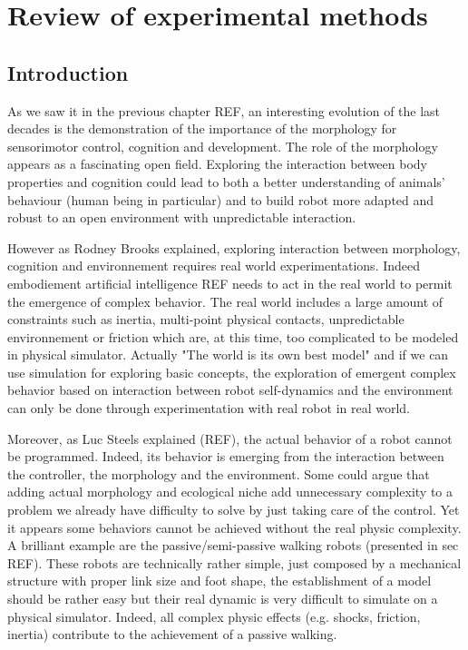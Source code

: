 
% 
\chapter{Review of experimental methods} %
\label{cha:experimental-methods}


\section{Introduction} %

As we saw it in the previous chapter REF, an interesting evolution of the last decades is the demonstration of the importance of the morphology for sensorimotor control, cognition and development. The role of the morphology appears as a fascinating open field. Exploring the interaction between body properties and cognition could lead to both a better understanding of animals’ behaviour (human being in particular) and to build robot more adapted and robust to an open environment with unpredictable interaction.


However as Rodney Brooks explained, exploring interaction between morphology, cognition and environnement requires real world experimentations. Indeed embodiement artificial intelligence REF needs to act in the real world to permit the emergence of complex behavior. The real world includes a large amount of constraints such as inertia, multi-point physical contacts, unpredictable environnement or friction which are, at this time, too complicated to be modeled in physical simulator. Actually "The world is its own best model" and if we can use simulation for exploring basic concepts, the exploration of emergent complex behavior based on interaction between robot self-dynamics and the environment can only be done through experimentation with real robot in real world.

Moreover, as Luc Steels explained (REF), the actual behavior of a robot cannot be programmed. Indeed, its behavior is emerging from the interaction between the controller, the morphology and the environment. Some could argue that adding actual morphology and ecological niche add unnecessary complexity to a problem we already have difficulty to solve by just taking care of the control. Yet it appears some behaviors cannot be achieved without the real physic complexity. A brilliant example are the passive/semi-passive walking robots (presented in sec REF). These robots are technically rather simple, just composed by a mechanical structure with proper link size and foot shape, the establishment of a model should be rather easy but their real dynamic is very difficult to simulate on a physical simulator. Indeed, all complex physic effects (e.g. shocks, friction, inertia) contribute to the achievement of a passive walking.

